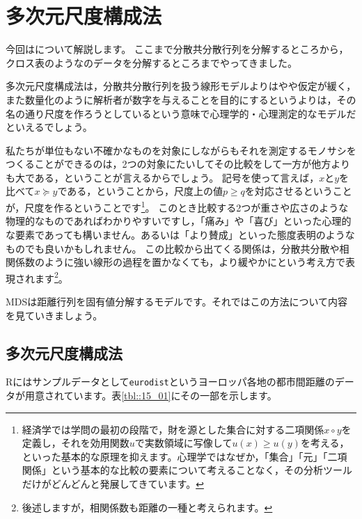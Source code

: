 \documentclass{ltjsbook}
\begin{document}
\chapter{多次元尺度構成法}
\label{x15_MDS}
今回はについて解説します。
ここまで分散共分散行列を分解するところから，クロス表のようなのデータを分解するところまでやってきました。

多次元尺度構成法は，分散共分散行列を扱う線形モデルよりはやや仮定が緩く，また数量化のように解析者が数字を与えることを目的にするというよりは，その名の通り尺度を作ろうとしているという意味で心理学的・心理測定的なモデルだといえるでしょう。

私たちが単位もない不確かなものを対象にしながらもそれを測定するモノサシをつくることができるのは，2つの対象にたいしてその比較をして一方が他方よりも大である，ということが言えるからでしょう。
記号を使って言えば，$x$と$y$を比べて$x \succeq y$である，ということから，尺度上の値$p \ge q$を対応させるということが，尺度を作るということです\footnote{経済学では学問の最初の段階で，財を源とした集合に対する二項関係$x \circ y$を定義し，それを効用関数$u$で実数領域に写像して$u(x) \ge u(y)$を考える，といった基本的な原理を抑えます。心理学ではなぜか，「集合」「元」「二項関係」という基本的な比較の要素について考えることなく，その分析ツールだけがどんどんと発展してきています。}。
このとき比較する2つが重さや広さのような物理的なものであればわかりやすいですし，「痛み」や「喜び」といった心理的な要素であっても構いません。あるいは「より賛成」といった態度表明のようなものでも良いかもしれません。
この比較から出てくる関係は，分散共分散や相関係数のように強い線形の過程を置かなくても，より緩やかにという考え方で表現されます\footnote{後述しますが，相関係数も距離の一種と考えられます。}。

MDSは距離行列を固有値分解するモデルです。それではこの方法について内容を見ていきましょう。

\section{多次元尺度構成法}
Rにはサンプルデータとして\texttt{eurodist}というヨーロッパ各地の都市間距離のデータが用意されています。表\ref{tbl::15_01}にその一部を示します。
\end{document}
